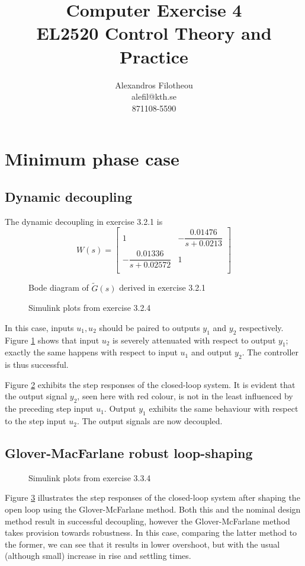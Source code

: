\documentclass[a4paper,12pt,oneside,onecolumn]{article} %
\title{
	Computer Exercise 4\\
	EL2520 Control Theory and Practice
}
\author{
  Alexandros Filotheou \\
  alefil@kth.se \\
  871108-5590
}
\newcommand{\imaget}[3][width=1.0\columnwidth]{
	\begin{figure}[H]
		\centering
      
		\caption{#3}
		\label{fig:#2}
	\end{figure}
}
\begin{document}
	\maketitle

	\section*{Minimum phase case}

	\subsection*{Dynamic decoupling}
	The dynamic decoupling in exercise 3.2.1 is
	\[
		W(s)=
    \begin{bmatrix}
      1                             & -\dfrac{0.01476}{s + 0.0213} \\
      -\dfrac{0.01336}{s + 0.02572}  & 1                           \\
    \end{bmatrix}
	\]

	\imaget{figures/bode_mp.tex}{Bode diagram of $\tilde{G}(s)$ derived in exercise 3.2.1}
	\imaget{figures/response_mp.tex}{Simulink plots from exercise 3.2.4}

  In this case, inputs $u_1, u_2$ should be paired to outputs $y_1$ and $y_2$
  respectively. Figure \ref{fig:figures/bode_mp.tex} shows that input $u_2$ is
  severely attenuated with respect to output $y_1$; exactly the same happens
  with respect to input $u_1$ and output $y_2$. The controller is thus
  successful.

  Figure \ref{fig:figures/response_mp.tex} exhibits the step responses of the
  closed-loop system. It is evident that the output signal $y_2$, seen here with
  red colour, is not in the least influenced by the preceding step input $u_1$.
  Output $y_1$ exhibits the same behaviour with respect to the step input $u_2$.
  The output signals are now decoupled.


	\subsection*{Glover-MacFarlane robust loop-shaping}

  \imaget{figures/response_mp_gmcf.tex}{Simulink plots from exercise 3.3.4}

  Figure \ref{fig:figures/response_mp_gmcf.tex} illustrates the step responses
  of the closed-loop system after shaping the open loop using the
  Glover-McFarlane method. Both this and the nominal design method result in
  successful decoupling, however the Glover-McFarlane method takes provision
  towards robustness. In this case, comparing the latter method to the former,
  we can see that it results in lower overshoot, but with the usual (although
  small) increase in rise and settling times.
\end{document}
